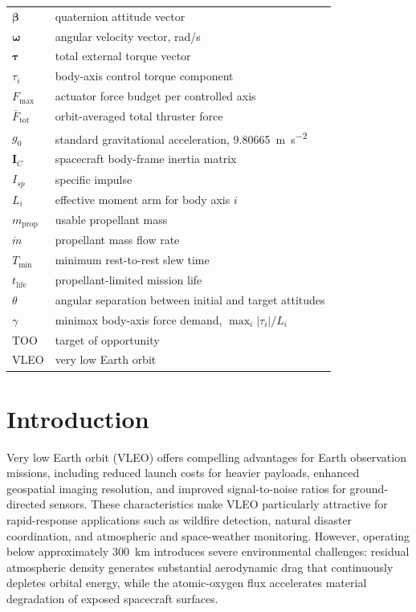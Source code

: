 \documentclass[conf]{new-aiaa}
\begin{document}
{\renewcommand\arraystretch{1.0}
\noindent\begin{longtable*}{@{}l @{\quad=\quad} l@{}}
$\boldsymbol{\beta}$ & quaternion attitude vector \\
$\boldsymbol{\omega}$ & angular velocity vector, rad/s \\
$\boldsymbol{\tau}$ & total external torque vector \\
$\tau_i$ & body-axis control torque component \\
$F_{\max}$ & actuator force budget per controlled axis \\
$\bar{F}_{\mathrm{tot}}$ & orbit-averaged total thruster force \\
$g_0$ & standard gravitational acceleration, \SI{9.80665}{\meter\per\second\squared} \\
$\mathbf{I}_{C}$ & spacecraft body-frame inertia matrix \\
$I_{sp}$ & specific impulse \\
$L_i$ & effective moment arm for body axis $i$ \\
$m_{\mathrm{prop}}$ & usable propellant mass \\
$\dot{m}$ & propellant mass flow rate \\
$T_{\min}$ & minimum rest-to-rest slew time \\
$t_{\mathrm{life}}$ & propellant-limited mission life \\
$\theta$ & angular separation between initial and target attitudes \\
$\gamma$ & minimax body-axis force demand, $\max_i |\tau_i|/L_i$ \\
TOO & target of opportunity \\
VLEO & very low Earth orbit
\end{longtable*}}

\section{Introduction} \label{sec:introduction}

Very low Earth orbit (VLEO) offers compelling advantages for Earth observation missions, including reduced launch costs for heavier payloads, enhanced geospatial imaging resolution, and improved signal-to-noise ratios for ground-directed sensors. These characteristics make VLEO particularly attractive for rapid-response applications such as wildfire detection, natural disaster coordination, and atmospheric and space-weather monitoring. However, operating below approximately \SI{300}{\kilo\meter} introduces severe environmental challenges: residual atmospheric density generates substantial aerodynamic drag that continuously depletes orbital energy, while the atomic-oxygen flux accelerates material degradation of exposed spacecraft surfaces.
\end{document}

